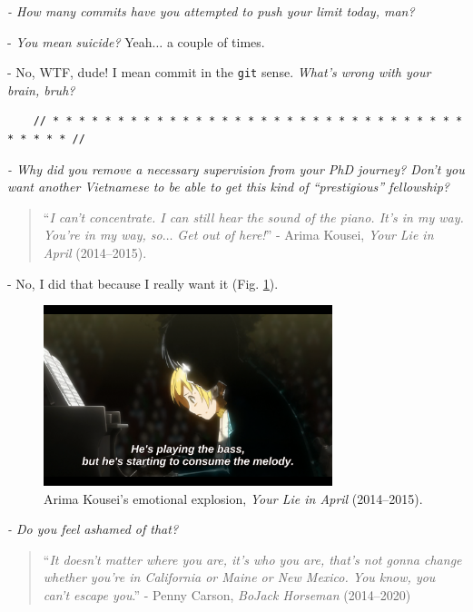 \documentclass[12pt]{article}
\begin{document}
{\it - How many commits have you attempted to push your limit today, man?}

- {\it You mean suicide?} Yeah$\ldots$ a couple of times.

- No, WTF, dude! I mean commit in the {\tt git} sense. {\it What's wrong with your brain, bruh?}

\begin{verbatim}
	// * * * * * * * * * * * * * * * * * * * * * * * * * * * * * * * * * * * * * //
\end{verbatim}

\noindent
{} {\it - Why did you remove a necessary supervision from your PhD journey? Don't you want another Vietnamese to be able to get this kind of ``prestigious'' fellowship?}

\begin{quotation}
	``{\it I can't concentrate. I can still hear the sound of the piano. It's in my way. You're in my way, so$\ldots$ Get out of here!}'' - Arima Kousei, {\it Your Lie in April}  (2014--2015).
\end{quotation}

- No, I did that because I really want it (Fig. \ref{fig4}).
\begin{figure}[h]
	\centering
	\includegraphics[width=0.75\textwidth]{Arima_Kousei_emotional_explosion}
	\caption{Arima Kousei's emotional explosion, {\it Your Lie in April} (2014--2015).}
	\label{fig4}
\end{figure}

{\it - Do you feel ashamed of that?}

\begin{quotation}
	``{\it It doesn't matter where you are, it's who you are, that's not gonna change whether you're in California or Maine or New Mexico. You know, you can't escape you}.'' - Penny Carson, {\it BoJack Horseman} (2014--2020)
\end{quotation}
\end{document}
